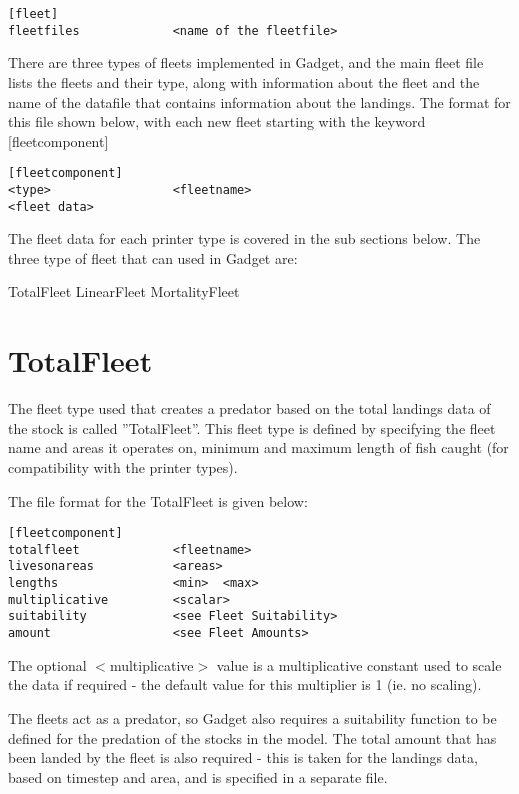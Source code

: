 \documentclass [a4paper, 10pt]{book}
\begin{document}
\begin{verbatim}
[fleet]
fleetfiles             <name of the fleetfile>
\end{verbatim}

There are three types of fleets implemented in Gadget, and the main fleet file lists the fleets and their type, along with information about the fleet and the name of the datafile that contains information about the landings.  The format for this file shown below, with each new fleet starting with the keyword [fleetcomponent]

\begin{verbatim}
[fleetcomponent]
<type>                 <fleetname>
<fleet data>
\end{verbatim}

The fleet data for each printer type is covered in the sub sections below.  The three type of fleet that can used in Gadget are:\newline

TotalFleet\newline
LinearFleet\newline
MortalityFleet

\section{TotalFleet}\label{sec:totalfleet}
The fleet type used that creates a predator based on the total landings data of the stock is called ''TotalFleet''.  This fleet type is defined by specifying the fleet name and areas it operates on, minimum and maximum length of fish caught (for compatibility with the printer types).

\bigskip
The file format for the TotalFleet is given below:

\begin{verbatim}
[fleetcomponent]
totalfleet             <fleetname>
livesonareas           <areas>
lengths                <min>  <max>
multiplicative         <scalar>
suitability            <see Fleet Suitability>
amount                 <see Fleet Amounts>
\end{verbatim}

The optional $<$multiplicative$>$ value is a multiplicative constant used to scale the data if required - the default value for this multiplier is 1 (ie. no scaling).

\bigskip
The fleets act as a predator, so Gadget also requires a suitability function to be defined for the predation of the stocks in the model.  The total amount that has been landed by the fleet is also required - this is taken for the landings data, based on timestep and area, and is specified in a separate file.
\end{document}
